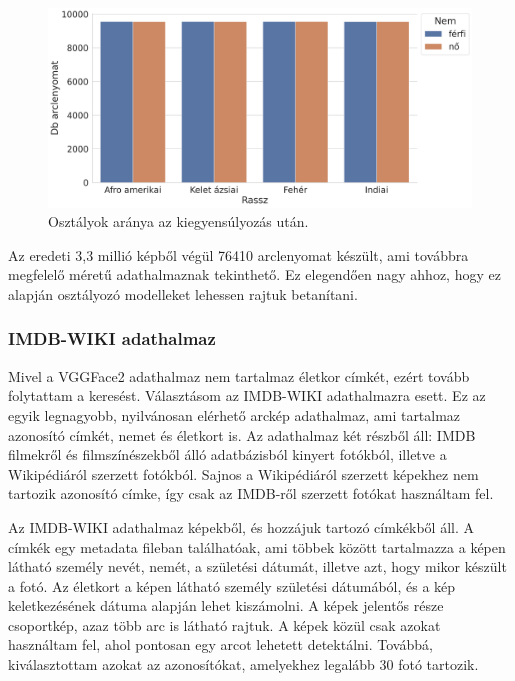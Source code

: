 \begin{figure}[ht]
	\centering
	\includegraphics[width=1\columnwidth]{figures/VGG_balanced.png}
	\caption{Osztályok aránya az kiegyensúlyozás után.}
	\label{fig:vgg_ba}
\end{figure}

Az eredeti 3,3 millió képből végül 76410 arclenyomat készült, ami továbbra megfelelő méretű adathalmaznak tekinthető. Ez elegendően nagy ahhoz, hogy ez alapján osztályozó modelleket lehessen rajtuk betanítani.

\subsubsection*{IMDB-WIKI adathalmaz}

Mivel a VGGFace2 adathalmaz nem tartalmaz életkor címkét, ezért tovább folytattam a keresést. Választásom az IMDB-WIKI \cite{imdbwiki2018} adathalmazra esett. Ez az egyik legnagyobb, nyilvánosan elérhető arckép adathalmaz, ami tartalmaz azonosító címkét, nemet és életkort is. Az adathalmaz két részből áll: IMDB filmekről és filmszínészekből álló adatbázisból kinyert fotókból, illetve a Wikipédiáról szerzett fotókból. Sajnos a Wikipédiáról szerzett képekhez nem tartozik azonosító címke, így csak az IMDB-ről szerzett fotókat használtam fel.

Az IMDB-WIKI adathalmaz képekből, és hozzájuk tartozó címkékből áll. A címkék egy metadata fileban találhatóak, ami többek között tartalmazza a képen látható személy nevét, nemét, a születési dátumát, illetve azt, hogy mikor készült a fotó. Az életkort a képen látható személy születési dátumából, és a kép keletkezésének dátuma alapján lehet kiszámolni. A képek jelentős része csoportkép, azaz több arc is látható rajtuk. A képek közül csak azokat használtam fel, ahol pontosan egy arcot lehetett detektálni. Továbbá, kiválasztottam azokat az azonosítókat, amelyekhez legalább 30 fotó tartozik.

